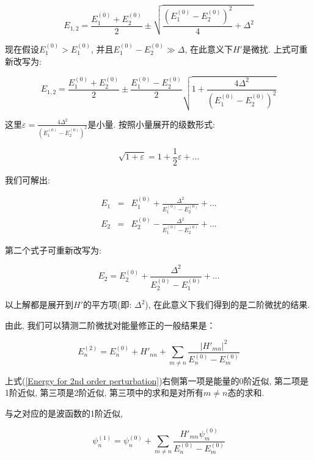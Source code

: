 \begin{equation}\label{quadratic solution for E}
E_{1,2}=\frac{E_1^{(0)}+E_2^{(0)}}{2} \pm \sqrt{\frac{\left(
E_1^{(0)}-E_2^{(0)} \right)^2}{4} +\Delta^2}
\end{equation}

现在假设$E_1^{(0)} > E_1^{(0)}$, 并且$E_1^{(0)}-E_2^{(0)} \gg
\Delta$, 在此意义下$H'$是微扰. 上式可重新改写为:

\begin{equation*}
E_{1,2}=\frac{E_1^{(0)}+E_2^{(0)}}{2} \pm
\frac{E_1^{(0)}-E_2^{(0)}}{2}
\sqrt{1+\frac{4\Delta^2}{\left(E_1^{(0)}-E_2^{(0)} \right)^2} }
\end{equation*}

这里$\varepsilon = \frac{4\Delta^2}{\left(E_1^{(0)}-E_2^{(0)}
\right)^2}$是小量. 按照小量展开的级数形式:

\begin{equation*}
\sqrt{1+\varepsilon} = 1 + \frac{1}{2}\varepsilon + ...
\end{equation*}

我们可解出:

\begin{eqnarray*}
E_1 &=& E_1^{(0)}+ \frac{\Delta^2}{E_1^{(0)}-E_2^{(0)}} +... \\
E_2 &=& E_2^{(0)}- \frac{\Delta^2}{E_1^{(0)}-E_2^{(0)}} +...
\end{eqnarray*}

第二个式子可重新改写为:

\begin{equation*}
E_2 = E_2^{(0)} + \frac{\Delta^2}{E_2^{(0)}-E_1^{(0)}} +...
\end{equation*}

以上解都是展开到$H'$的平方项(即: $\Delta^2$),
在此意义下我们得到的是二阶微扰的结果.


由此, 我们可以猜测二阶微扰对能量修正的一般结果是：


\begin{equation}\label{Energy for 2nd order perturbation}
E_n^{(2)}=E_n^{(0)} + H'_{nn} + \sum\limits_{m \ne n}
\frac{\left|H'_{mn} \right|^2}{E_n^{(0)}-E_m^{(0)}}
\end{equation}

上式(\ref{Energy for 2nd order
perturbation})右侧第一项是能量的0阶近似, 第二项是1阶近似,
第三项是2阶近似, 第三项中的求和是对所有$m \ne n$态的求和.

与之对应的是波函数的1阶近似,

\begin{equation}\label{wave function for 1st order perturbation}
\psi_n^{(1)} = \psi_n^{(0)} + \sum\limits_{m \ne n} \frac{ H'_{mn}
\psi_m^{(0)}}{E_n^{(0)}-E_m^{(0)}}
\end{equation}

